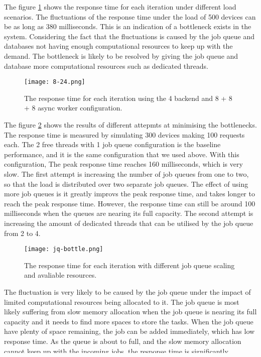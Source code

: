 \documentclass[../thesis.tex]{subfiles}
\begin{document}
The figure \ref{fig:8-24} shows the response time for each iteration under different load scenarios. The fluctuations of the response time under the load of 500 devices can be as long as 380 milliseconds. This is an indication of a bottleneck exists in the system. Considering the fact that the fluctuations is caused by the job queue and databases not having enough computational resources to keep up with the demand. The bottleneck is likely to be resolved by giving the job queue and database more computational resources such as dedicated threads.

\begin{figure}[!ht]
	\centering
	\texttt{[image: 8-24.png]}
	\caption{The response time for each iteration using the 4 backend and 8 + 8 + 8 async worker configuration.}
	\label{fig:8-24}
\end{figure}

The figure \ref{fig:jq-bottle} shows the results of different attepmts at minimising the bottlenecks. The response time is measured by simulating 300 devices making 100 requests each.  The 2 free threads with 1 job queue configuration is the baseline performance, and it is the same configuration that we used above. With this configuration, The peak response time reaches 160 milliseconds, which is very slow. The first attempt is increasing the number of job queues from one to two, so that the load is distributed over two separate job queues. The effect of using more job queues is it greatly improvs the peak response time, and takes longer to reach the peak response time. However, the response time can still be around 100 milliseconds when the queues are nearing its full capacity. The second attempt is increasing the amount of dedicated threads that can be utilised by the job queue from 2 to 4. 

\begin{figure}[!ht]
	\centering
	\texttt{[image: jq-bottle.png]}
	\caption{The response time for each iteration with different job queue scaling and avaliable resources.}
	\label{fig:jq-bottle}
\end{figure}


The fluctuation is very likely to be caused by the job queue under the impact of limited computational resources being allocated to it. The job queue is most likely suffering from slow memory allocation when the job queue is nearing its full capacity and it needs to find more spaces to store the tasks. When the job queue have plenty of space remaining, the job can be added immediately, which has low response time. As the queue is about to full, and the slow memory allocation cannot keep up with the incoming jobs, the response time is significantly increased as it is waiting for free spaces to be available in the queue. Once the memory allocation is completed, there are plenty of space left, the response time drops again. This process is repeated again and again, causing the fluctuations. 
\end{document}
